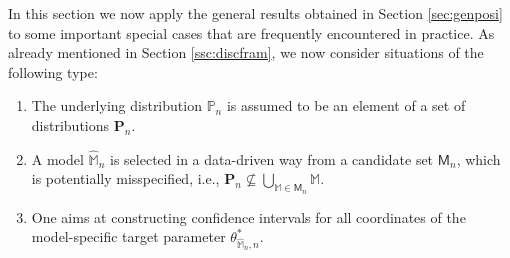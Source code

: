\documentclass[preprint]{imsart}
\newcommand{\M}{\mathbb M}
\numberwithin{equation}{section}
\begin{document}
In this section we now apply the general results obtained in Section \ref{sec:genposi} to some important special cases that are frequently encountered in practice. As already mentioned in Section \ref{ssc:discfram}, we now consider situations of the following type:
%
\begin{enumerate}
\item The underlying distribution $\mathbb{P}_n$ is assumed to be an element of a set of distributions $\mathbf{P}_n$.
\item A model $\hat{\mathbb{M}}_n$ is selected in a data-driven way from a candidate set $\mathsf{M}_n$, which is potentially misspecified, i.e., $\mathbf{P}_n \not \subseteq \bigcup_{\M\in\mathsf{M}_n}\M$.
\item One aims at constructing confidence intervals for all coordinates of the model-specific target parameter $\theta^*_{\hat{\mathbb{M}}_n, n}$.
\end{enumerate}
%
\end{document}
